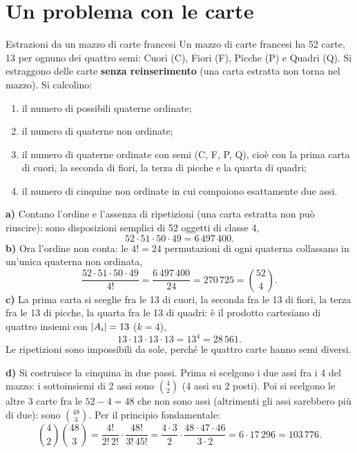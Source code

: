 \section{Un problema con le carte}

\begin{esercizio}{Estrazioni da un mazzo di carte francesi}
Un mazzo di carte francesi ha 52 carte, 13 per ognuno dei quattro semi: Cuori (C), Fiori (F), Picche (P) e Quadri (Q).
Si estraggono delle carte \textbf{senza reinserimento} (una carta estratta non torna nel mazzo). Si calcolino:
\begin{enumerate}[label=\alph*)]
  \item il numero di possibili quaterne ordinate;
  \item il numero di quaterne non ordinate;
  \item il numero di quaterne ordinate con semi (C, F, P, Q), cioè con la prima carta di cuori, la seconda di fiori, la
        terza di picche e la quarta di quadri;
  \item il numero di cinquine non ordinate in cui compaiono esattamente due assi.
\end{enumerate}
\svolgimento
\textbf{a)} Contano l'ordine e l'assenza di ripetizioni (una carta estratta non può riuscire): sono disposizioni
semplici di 52 oggetti di classe 4,
\[ 52 \cdot 51 \cdot 50 \cdot 49 = 6\,497\,400 . \]
\textbf{b)} Ora l'ordine non conta: le $4! = 24$ permutazioni di ogni quaterna collassano in un'unica quaterna non
ordinata,
\[ \frac{52 \cdot 51 \cdot 50 \cdot 49}{4!} = \frac{6\,497\,400}{24} = 270\,725 = \binom{52}{4} . \]
\textbf{c)} La prima carta si sceglie fra le 13 di cuori, la seconda fra le 13 di fiori, la terza fra le 13 di picche,
la quarta fra le 13 di quadri: è il prodotto cartesiano di quattro insiemi con $\left\lvert A_i \right\rvert = 13$ ($k = 4$),
\[ 13 \cdot 13 \cdot 13 \cdot 13 = 13^4 = 28\,561 . \]
Le ripetizioni sono impossibili da sole, perché le quattro carte hanno semi diversi.

\textbf{d)} Si costruisce la cinquina in due passi. Prima si scelgono i due assi fra i 4 del mazzo: i sottoinsiemi
di 2 assi sono $\binom{4}{2}$ (4 assi su 2 posti). Poi si scelgono le altre 3 carte fra le $52 - 4 = 48$ che non sono
assi (altrimenti gli assi sarebbero più di due): sono $\binom{48}{3}$. Per il principio fondamentale:
\[
  \binom{4}{2}\binom{48}{3} = \frac{4!}{2!\,2!} \cdot \frac{48!}{3!\,45!}
  = \frac{4 \cdot 3}{2} \cdot \frac{48 \cdot 47 \cdot 46}{3 \cdot 2} = 6 \cdot 17\,296 = 103\,776 .
\]
\end{esercizio}

